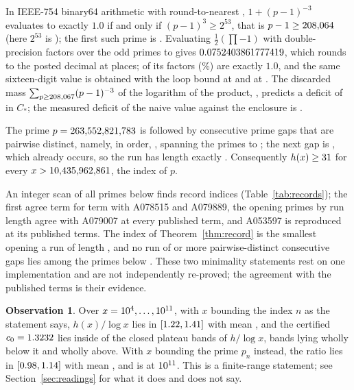 \documentclass[11pt]{article}
\theoremstyle{definition}\newtheorem{observation}{Observation}
\newcommand{\Cstar}{C_{*}}
\begin{document}
\begin{proposition}\label{prop:mechanism}
In IEEE-754 binary64 arithmetic with round-to-nearest \cite{IEEE754}, $1+(p-1)^{-3}$ evaluates to exactly $1.0$ if and only if $(p-1)^3\ge2^{53}$, that is $p-1\ge208{,}064$ (here $2^{53}$ is \TwoFiftyThree); the first such prime is \ThresholdPrime. Evaluating $\tfrac12(\prod-1)$ with double-precision factors over the odd primes to \NaiveLimit{} gives $0.0752403861777419$, which rounds to the posted decimal \CstarPublished{} at \CstarPubDecimals{} places; \NaiveDropped{} of its \NaivePrimes{} factors (\NaiveDropPct\%) are exactly $1.0$, and the same sixteen-digit value is obtained with the loop bound at \NaiveOtherBoundLo{} and at \NaiveOtherBoundHi. The discarded mass $\sum_{p\ge208{,}067}(p-1)^{-3}$ of the logarithm of the product, \MissingMass, predicts a deficit of \PredictedGap{} in $\Cstar$; the measured deficit of the naive value against the enclosure is \ObservedGap.
\end{proposition}

\begin{theorem}\label{thm:record}
The prime $p=263{,}552{,}821{,}783$ is followed by \ExtLen{} consecutive prime gaps that are pairwise distinct, namely, in order, \ExtGaps, spanning the primes \ExtPrime{} to \ExtSpanEnd; the next gap is \ExtNextGap, which already occurs, so the run has length exactly \ExtLen. Consequently $h(x)\ge31$ for every $x>10{,}435{,}962{,}861$, the index of $p$.
\end{theorem}

\begin{proposition}\label{prop:scan}
An integer scan of all primes below \HLimit{} finds \HDistinct{} record indices (Table~\ref{tab:records}); the first \OeisAgree{} agree term for term with A078515 and A079889, the opening primes by run length agree with A079007 at every published term, and A053597 is reproduced at its \OeisCterms{} published terms. The index \ExtIndex{} of Theorem~\ref{thm:record} is the smallest opening a run of length \HMax, and no run of \HMaxNext{} or more pairwise-distinct consecutive gaps lies among the primes below \HLimit. These two minimality statements rest on one implementation and are not independently re-proved; the agreement with the published terms is their evidence.
\end{proposition}

\begin{observation}\label{obs:readings}
Over $x=10^{4},\dots,10^{11}$, with $x$ bounding the index $n$ as the statement says, $h(x)/\log x$ lies in $[1.22,1.41]$ with mean \IndexRatioMean, and the certified $c_0=1.3232$ lies inside \BandsInside{} of the \BandsClosed{} closed plateau bands of $h/\log x$, \BandsBelow{} bands lying wholly below it and \BandsAbove{} wholly above. With $x$ bounding the prime $p_n$ instead, the ratio lies in $[0.98,1.14]$ with mean \PrimeRatioMean, and is \PrimeReadingLast{} at $10^{11}$. This is a finite-range statement; see Section~\ref{sec:readings} for what it does and does not say.
\end{observation}
\end{document}
